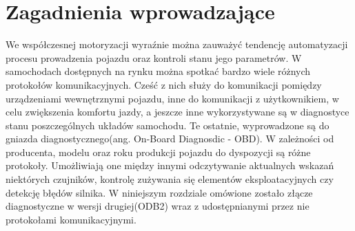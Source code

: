\documentclass[12pt]{article} %
\numberwithin{equation}{subsection}
\numberwithin{figure}{section}
\numberwithin{table}{section}
\begin{document}
		\newpage

\section{Zagadnienia wprowadzające}
	\hspace{0.5cm}We współczesnej motoryzacji wyraźnie można zauważyć tendencję automatyzacji procesu prowadzenia pojazdu oraz kontroli stanu jego parametrów. W samochodach dostępnych na rynku można spotkać bardzo wiele różnych protokołów komunikacyjnych. Cześć z nich służy do komunikacji pomiędzy urządzeniami wewnętrznymi pojazdu, inne do komunikacji z użytkownikiem, w celu zwiększenia komfortu jazdy, a jeszcze inne wykorzystywane są w diagnostyce stanu poszczególnych układów samochodu. Te ostatnie, wyprowadzone są do gniazda diagnostycznego(ang. On-Board Diagnosdic - OBD). W zależności od producenta, modelu oraz roku produkcji pojazdu do dyspozycji są różne protokoły. Umożliwiają one między innymi odczytywanie aktualnych wskazań niektórych czujników, kontrolę zużywania się elementów eksploatacyjnych czy detekcję błędów silnika. W niniejszym rozdziale omówione zostało złącze diagnostyczne w wersji drugiej(ODB2) wraz z udostępnianymi przez nie protokołami komunikacyjnymi.
\end{document}

